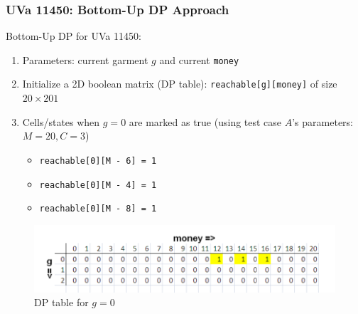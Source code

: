 \documentclass{beamer}
\begin{document}
\begin{frame}[fragile]
\frametitle{UVa 11450: Bottom-Up DP Approach}

Bottom-Up DP for UVa 11450: 
\begin{enumerate}
    \item Parameters: current garment $g$ and current \verb|money|
    \item Initialize a 2D boolean matrix (DP table): \color{blue}\verb|reachable[g][money]| \color{black} of size $20\times 201$
    \item Cells/states when $g=0$ are marked as true (using test case $A$'s parameters: $M=20, C=3$)
    	\begin{itemize}
		    \item \verb|reachable[0][M - 6] = 1|
		    \item \verb|reachable[0][M - 4] = 1|
		    \item \verb|reachable[0][M - 8] = 1|		    		    
		\end{itemize}
\end{enumerate}

\pause

\begin{figure}
    \centering
    \includegraphics[scale=0.4]{imgs/11450_1.png}
    \caption{DP table for $g=0$}
\end{figure}


\end{frame}
\end{document}
